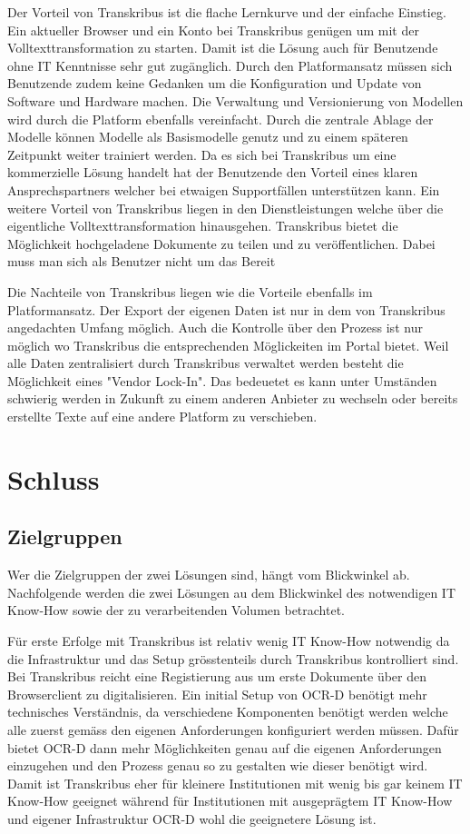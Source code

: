 \documentclass[a4paper,oneside, 12pt]{report}
\begin{document}
Der Vorteil von Transkribus ist die flache Lernkurve und der einfache Einstieg. Ein aktueller Browser und ein Konto bei Transkribus genügen um mit der Volltexttransformation zu starten. Damit ist die Lösung auch für Benutzende ohne IT Kenntnisse sehr gut zugänglich. Durch den Platformansatz müssen sich Benutzende zudem keine Gedanken um die Konfiguration und Update von Software und Hardware machen. Die Verwaltung und Versionierung von Modellen wird durch die Platform ebenfalls vereinfacht. Durch die zentrale Ablage der Modelle können Modelle als Basismodelle genutz und zu einem späteren Zeitpunkt weiter trainiert werden. Da es sich bei Transkribus um eine kommerzielle Lösung handelt hat der Benutzende den Vorteil eines klaren Ansprechspartners welcher bei etwaigen Supportfällen unterstützen kann. Ein weitere Vorteil von Transkribus liegen in den Dienstleistungen welche über die eigentliche Volltexttransformation hinausgehen. Transkribus bietet die Möglichkeit hochgeladene Dokumente zu teilen und zu veröffentlichen. Dabei muss man sich als Benutzer nicht um das Bereit

Die Nachteile von Transkribus liegen wie die Vorteile ebenfalls im Platformansatz. Der Export der eigenen Daten ist nur in dem von Transkribus angedachten Umfang möglich. Auch die Kontrolle über den Prozess ist nur möglich wo Transkribus die entsprechenden Möglickeiten im Portal bietet. Weil alle Daten zentralisiert durch Transkribus verwaltet werden besteht die Möglichkeit eines "Vendor Lock-In". Das bedeuetet es kann unter Umständen schwierig werden in Zukunft zu einem anderen Anbieter zu wechseln oder bereits erstellte Texte auf eine andere Platform zu verschieben.

\chapter{Schluss}\label{sec:schluss}

\section{Zielgruppen}
Wer die Zielgruppen der zwei Lösungen sind, hängt vom Blickwinkel ab. Nachfolgende werden die zwei Lösungen au dem Blickwinkel des notwendigen IT Know-How sowie der zu verarbeitenden Volumen betrachtet.

Für erste Erfolge mit Transkribus ist relativ wenig IT Know-How notwendig da die Infrastruktur und das Setup grösstenteils durch Transkribus kontrolliert sind. Bei Transkribus reicht eine Registierung aus um erste Dokumente über den Browserclient zu digitalisieren. Ein initial Setup von OCR-D benötigt mehr technisches Verständnis, da verschiedene Komponenten benötigt werden welche alle zuerst gemäss den eigenen Anforderungen konfiguriert werden müssen. Dafür bietet OCR-D dann mehr Möglichkeiten genau auf die eigenen Anforderungen einzugehen und den Prozess genau so zu gestalten wie dieser benötigt wird.  Damit ist Transkribus eher für kleinere Institutionen mit wenig bis gar keinem IT Know-How geeignet während für Institutionen mit ausgeprägtem IT Know-How und eigener Infrastruktur OCR-D wohl die geeignetere Lösung ist.
\end{document}
